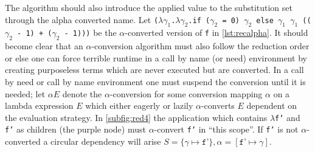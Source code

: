 \documentclass[11pt,oneside,a4paper]{report}
\begin{document}
The algorithm should also introduce the applied value to the substitution set through the alpha converted name.
Let \texttt{($\lambda\gamma_1$.$\lambda\gamma_2$.if ($\gamma_2$ = 0) $\gamma_2$ else $\gamma_1$ $\gamma_1$ (($\gamma_2$ - 1) + ($\gamma_2$ - 1)))} be the $\alpha$-converted version of \texttt{f} in \autoref{lst:recalpha}.
It should become clear that an $\alpha$-conversion algorithm must also follow the reduction order or else one can force terrible runtime in a call by name (or need) environment by creating purposeless terms which are never executed but are converted.
In a call by need or call by name environment one must suspend the conversion until it is needed; let $\alpha E$ denote the $\alpha$-conversion for some conversion mapping $\alpha$ on a lambda expression $E$ which either eagerly or lazily $\alpha$-converts $E$ dependent on the evaluation strategy.
In \autoref{subfig:red4} the application which contains \texttt{$\lambda$f'} and \texttt{f'} as children (the purple node) must $\alpha$-convert \texttt{f'} in ``this scope''.
If \texttt{f'} is not $\alpha$-converted a circular dependency will arise $S = \{ \gamma \mapsto \texttt{f'} \}, \alpha = [ \texttt{f'} \mapsto \gamma ]$.
\end{document}
